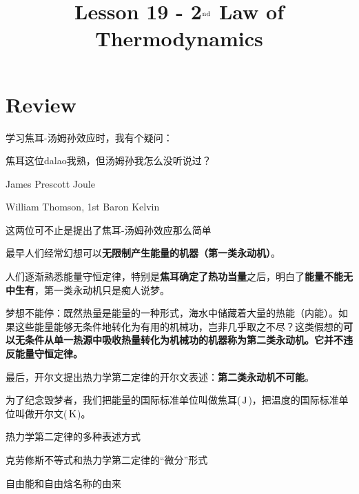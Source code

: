\documentclass[CJK]{beamer}
\title{Lesson 19 - 2$^{\rm nd}$ Law of Thermodynamics}
\author{}
\date{}
\begin{document}

\section{Review}

\begin{frame}
\bchL
学习焦耳-汤姆孙效应时，我有个疑问：

\skipline

焦耳这位dalao我熟，但汤姆孙我怎么没听说过？

\echL
\end{frame}

\begin{frame}
\bch
\bitem
\item{James Prescott Joule
  
}
\item{William Thomson, 1st Baron Kelvin 

}
\eitem
这两位可不止是提出了焦耳-汤姆孙效应那么简单
\ech
\end{frame}



\begin{frame}
\bch
\bitem
\item{最早人们经常幻想可以{\bf 无限制产生能量的机器（第一类永动机）}。}
\item{人们逐渐熟悉能量守恒定律，特别是{\bf 焦耳确定了热功当量}之后，明白了{\bf 能量不能无中生有}，第一类永动机只是痴人说梦。}
\item{梦想不能停：既然热量是能量的一种形式，海水中储藏着大量的热能（内能）。如果这些能量能够无条件地转化为有用的机械功，岂非几乎取之不尽？这类假想的{\bf 可以无条件从单一热源中吸收热量转化为机械功的机器称为第二类永动机。它并不违反能量守恒定律。}}
\item{最后，开尔文提出热力学第二定律的开尔文表述：{\bf 第二类永动机不可能}。}
\eitem

\ech
\end{frame}

\begin{frame}
\bch
{}

为了纪念毁梦者，我们把能量的国际标准单位叫做焦耳($\,\mathrm{J}$)，把温度的国际标准单位叫做开尔文($\,\mathrm{K}$)。
\ech
\end{frame}

\begin{frame}
\bch
\bitem
\item{热力学第二定律的多种表述方式}
\item{克劳修斯不等式和热力学第二定律的“微分”形式}
\item{自由能和自由焓名称的由来}
\eitem
\ech
\end{frame}
\end{document}
